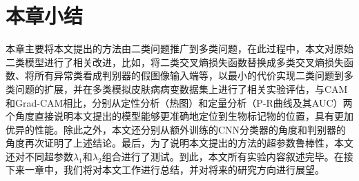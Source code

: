 \section{本章小结}
本章主要将本文提出的方法由二类问题推广到多类问题，在此过程中，本文对原始二类模型进行了相关改进，比如，将二类交叉熵损失函数替换成多类交叉熵损失函数、将所有异常类看成判别器的假图像输入端等，以最小的代价实现二类问题到多类问题的扩展，并在多类模拟皮肤病病变数据集上进行了相关实验评估，与CAM和Grad-CAM相比，分别从定性分析（热图）和定量分析（P-R曲线及其AUC）两个角度直接说明本文提出的模型能够更准确地定位到生物标记物的位置，具有更加优异的性能。除此之外，本文还分别从额外训练的CNN分类器的角度和判别器的角度再次证明了上述结论。最后，为了说明本文提出的方法的超参数鲁棒性，本文还对不同超参数$\lambda_{1}$和$\lambda_{2}$组合进行了测试。到此，本文所有实验内容叙述完毕。在接下来一章中，我们将对本文工作进行总结，并对将来的研究方向进行展望。

